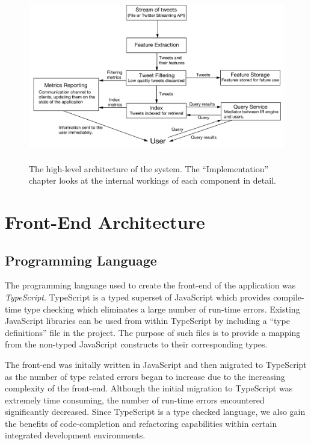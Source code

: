 \documentclass{l4proj}
\begin{document}
\begin{figure}
\centering
\includegraphics[height=278px,width=496px]{architecture.pdf}
\caption{The high-level architecture of the system. The ``Implementation'' chapter looks at the internal workings of each component in detail.}
\label{architecture}
\end{figure}




        
    \section{Front-End Architecture}
    
        \subsection{Programming Language}
        The programming language used to create the front-end of the application was \textit{TypeScript}. TypeScript is a typed superset of JavaScript which provides compile-time type checking which eliminates a large number of run-time errors. Existing JavaScript libraries can be used from within TypeScript by including a ``type definitions'' file in the project. The purpose of such files is to provide a mapping from the non-typed JavaScript constructs to their corresponding types.
        
        The front-end was initally written in JavaScript and then migrated to TypeScript as the number of type related errors began to increase due to the increasing complexity of the front-end. Although the initial migration to TypeScript was extremely time consuming, the number of run-time errors encountered significantly decreased. Since TypeScript is a type checked language, we also gain the benefits of code-completion and refactoring capabilities within certain integrated development environments.
    
\end{document}
